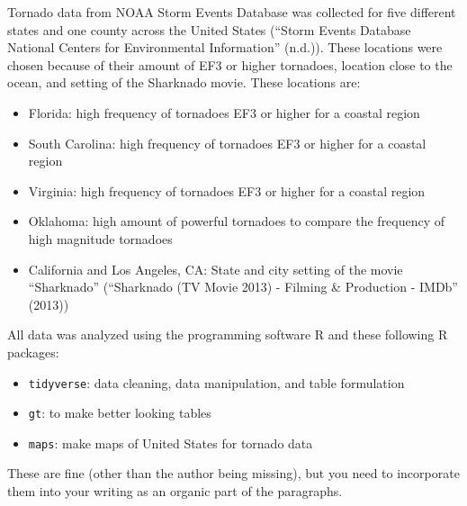 \documentclass[
  letterpaper,
  DIV=11,
  numbers=noendperiod]{scrreprt}
\begin{document}
Tornado data from NOAA Storm Events Database was collected for five
different states and one county across the United States ({``Storm
Events Database {\textbar} National Centers for Environmental
Information''} (n.d.)). These locations were chosen because of their
amount of EF3 or higher tornadoes, location close to the ocean, and
setting of the Sharknado movie. These locations are:

\begin{itemize}
\item
  Florida: high frequency of tornadoes EF3 or higher for a coastal
  region
\item
  South Carolina: high frequency of tornadoes EF3 or higher for a
  coastal region
\item
  Virginia: high frequency of tornadoes EF3 or higher for a coastal
  region
\item
  Oklahoma: high amount of powerful tornadoes to compare the frequency
  of high magnitude tornadoes
\item
  California and Los Angeles, CA: State and city setting of the movie
  ``Sharknado'' ({``Sharknado ({TV} Movie 2013) - Filming \& Production
  - {IMDb}''} (2013))
\end{itemize}

All data was analyzed using the programming software R and these
following R packages:

\begin{itemize}
\item
  \texttt{tidyverse}: data cleaning, data manipulation, and table
  formulation
\item
  \texttt{gt}: to make better looking tables
\item
  \texttt{maps}: make maps of United States for tornado data
\end{itemize}

\begin{tcolorbox}[enhanced jigsaw, coltitle=black, leftrule=.75mm, colframe=quarto-callout-note-color-frame, bottomtitle=1mm, bottomrule=.15mm, arc=.35mm, colback=white, colbacktitle=quarto-callout-note-color!10!white, titlerule=0mm, opacitybacktitle=0.6, breakable, toptitle=1mm, title=\textcolor{quarto-callout-note-color}{\faInfo}\hspace{0.5em}{Note}, left=2mm, toprule=.15mm, rightrule=.15mm, opacityback=0]

These are fine (other than the author being missing), but you need to
incorporate them into your writing as an organic part of the paragraphs.

\end{tcolorbox}
\end{document}
